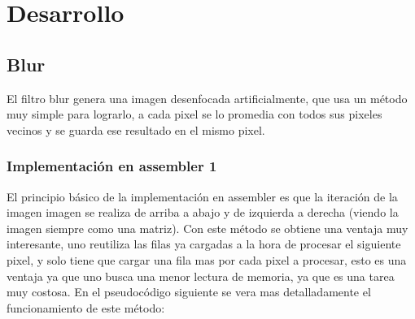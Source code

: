 \documentclass[a4paper]{article}
\begin{document}
\newpage 

\section{Desarrollo}

%
%
\subsection{Blur}

El filtro blur genera una imagen desenfocada artificialmente, que usa un método muy simple para lograrlo, a cada pixel se lo promedia con todos sus pixeles vecinos y se guarda ese resultado en el mismo pixel.

\subsubsection{Implementación en assembler 1}

El principio básico de la implementación en assembler es que la iteración de la imagen imagen se realiza de arriba a abajo y de izquierda a derecha (viendo la imagen siempre como una matriz). Con este método se obtiene una ventaja muy interesante, uno reutiliza las filas ya cargadas a la hora de procesar el siguiente pixel, y solo tiene que cargar una fila mas por cada pixel a procesar, esto es una ventaja ya que uno busca una menor lectura de memoria, ya que es una tarea muy costosa. En el pseudocódigo siguiente se vera mas detalladamente el funcionamiento de este método:

\end{document}

